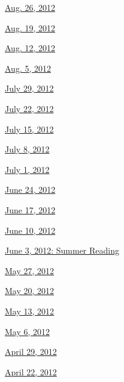 \href{http://www.nytimes3xbfgragh.onion/indexes/2012/08/26/books/review/index.html}{Aug.
26, 2012}

\href{http://www.nytimes3xbfgragh.onion/indexes/2012/08/19/books/review/index.html}{Aug.
19, 2012}

\href{http://www.nytimes3xbfgragh.onion/indexes/2012/08/12/books/review/index.html}{Aug.
12, 2012}

\href{http://www.nytimes3xbfgragh.onion/indexes/2012/08/05/books/review/index.html}{Aug.
5, 2012}

\href{http://www.nytimes3xbfgragh.onion/indexes/2012/07/29/books/review/index.html}{July
29, 2012}

\href{http://www.nytimes3xbfgragh.onion/indexes/2012/07/22/books/review/index.html}{July
22, 2012}

\href{http://www.nytimes3xbfgragh.onion/indexes/2012/07/15/books/review/index.html}{July
15, 2012}

\href{http://www.nytimes3xbfgragh.onion/indexes/2012/07/08/books/review/index.html}{July
8, 2012}

\href{http://www.nytimes3xbfgragh.onion/indexes/2012/07/01/books/review/index.html}{July
1, 2012}

\href{http://www.nytimes3xbfgragh.onion/indexes/2012/06/24/books/review/index.html}{June
24, 2012}

\href{http://www.nytimes3xbfgragh.onion/indexes/2012/06/17/books/review/index.html}{June
17, 2012}

\href{http://www.nytimes3xbfgragh.onion/indexes/2012/06/10/books/review/index.html}{June
10, 2012}

\href{http://www.nytimes3xbfgragh.onion/indexes/2012/06/03/books/review/index.html}{June
3, 2012: Summer Reading}

\href{http://www.nytimes3xbfgragh.onion/indexes/2012/05/27/books/review/index.html}{May
27, 2012}

\href{http://www.nytimes3xbfgragh.onion/indexes/2012/05/20/books/review/index.html}{May
20, 2012}

\href{http://www.nytimes3xbfgragh.onion/indexes/2012/05/13/books/review/index.html}{May
13, 2012}

\href{http://www.nytimes3xbfgragh.onion/indexes/2012/05/06/books/review/index.html}{May
6, 2012}

\href{http://www.nytimes3xbfgragh.onion/indexes/2012/04/29/books/review/index.html}{April
29, 2012}

\href{http://www.nytimes3xbfgragh.onion/indexes/2012/04/22/books/review/index.html}{April
22, 2012}

